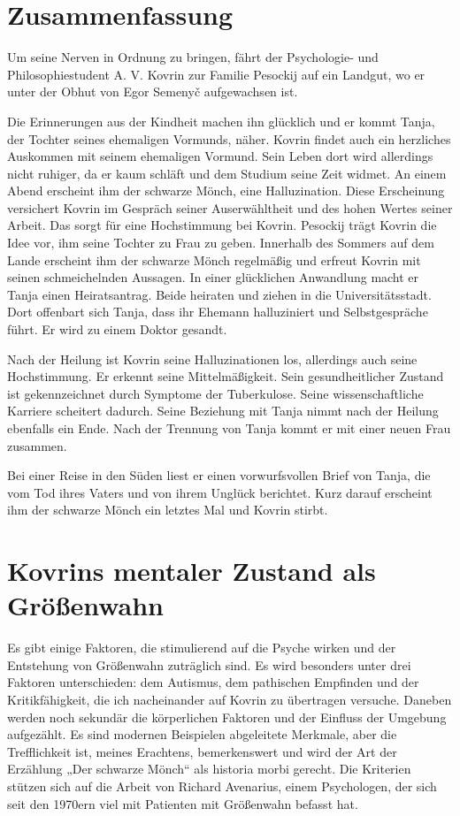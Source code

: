 \documentclass{../../sem_paper}
\begin{document}
\section{Zusammenfassung}
Um seine Nerven in Ordnung zu bringen, fährt der Psychologie- und Philosophiestudent A.
V. Kovrin zur Familie Pesockij auf ein Landgut, wo er unter der Obhut von Egor
Semenyč aufgewachsen ist.

Die Erinnerungen aus der Kindheit machen ihn glücklich und er kommt Tanja, der Tochter
seines ehemaligen Vormunds, näher. Kovrin findet auch ein herzliches Auskommen mit seinem
ehemaligen Vormund. Sein Leben dort wird allerdings nicht ruhiger, da er kaum schläft und dem
Studium seine Zeit widmet. An einem Abend erscheint ihm der schwarze Mönch, eine
Halluzination. Diese Erscheinung versichert Kovrin im Gespräch seiner Auserwähltheit und des
hohen Wertes seiner Arbeit. Das sorgt für eine Hochstimmung bei Kovrin. Pesockij trägt Kovrin die
Idee vor, ihm seine Tochter zu Frau zu geben. Innerhalb des Sommers auf dem Lande erscheint ihm
der schwarze Mönch regelmäßig und erfreut Kovrin mit seinen schmeichelnden Aussagen. In einer
glücklichen Anwandlung macht er Tanja einen Heiratsantrag. Beide heiraten und ziehen in die
Universitätsstadt. Dort offenbart sich Tanja, dass ihr Ehemann halluziniert und Selbstgespräche
führt. Er wird zu einem Doktor gesandt.

Nach der Heilung ist Kovrin seine Halluzinationen los, allerdings auch seine Hochstimmung.
Er erkennt seine Mittelmäßigkeit. Sein gesundheitlicher Zustand ist gekennzeichnet durch
Symptome der Tuberkulose. Seine wissenschaftliche Karriere scheitert dadurch. Seine
Beziehung mit Tanja nimmt nach der Heilung ebenfalls ein Ende. Nach der Trennung von
Tanja kommt er mit einer neuen Frau zusammen.

Bei einer Reise in den Süden liest er einen vorwurfsvollen Brief von Tanja, die vom Tod ihres
Vaters und von ihrem Unglück berichtet. Kurz darauf erscheint ihm der schwarze Mönch ein letztes
Mal und Kovrin stirbt.
\section{Kovrins mentaler Zustand als Größenwahn}
Es gibt einige Faktoren, die stimulierend auf die Psyche wirken und der Entstehung von
Größenwahn zuträglich sind. Es wird besonders unter drei Faktoren unterschieden: dem Autismus,
dem pathischen Empfinden und der Kritikfähigkeit, die ich nacheinander auf Kovrin zu
übertragen versuche.  Daneben werden noch sekundär die körperlichen Faktoren und der Einfluss
der Umgebung aufgezählt. Es sind modernen Beispielen abgeleitete Merkmale, aber die
Trefflichkeit ist, meines Erachtens, bemerkenswert und wird der Art der Erzählung „Der schwarze
Mönch“ als historia morbi gerecht. Die Kriterien stützen sich auf die Arbeit von Richard Avenarius, einem
Psychologen, der sich seit den 1970ern viel mit Patienten mit Größenwahn befasst hat.
\end{document}
